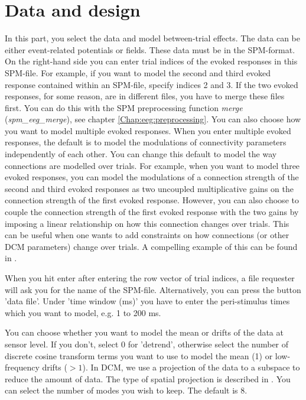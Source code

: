 \section{Data and design}
In this part, you select the data and model between-trial
effects. The data can be either event-related
potentials or fields. These data must be in the SPM-format. On the
right-hand side you can enter trial indices of the evoked responses in
this SPM-file. For example, if you want to model the
second and third evoked response contained within an SPM-file, specify
indices 2 and 3. If the two evoked responses, for some reason, are in
different files, you have to merge these files first. You can do this
with the SPM preprocessing function \textit{merge}
(\textit{spm\_eeg\_merge}), see chapter
\ref{Chap:eeg:preprocessing}. You can also choose how you want to
model multiple evoked responses. When you enter multiple evoked
responses, the default is to model the modulations of connectivity
parameters independently of each other. You can change this default to
model the way connections are modelled over trials. For
example, when you want to model three evoked responses, you can model
the modulations of a connection strength of the second and third
evoked responses as two uncoupled multiplicative gains on the connection
strength of the first evoked response. However, you can also choose to
couple the connection strength of the first evoked response with the
two gains by imposing a linear relationship on how this connection changes over trials. This can be useful when one wants to add
constraints on how connections (or other DCM parameters)
change over trials. A compelling example of this can be
found in \cite{marta_mmndcm}.

When you hit enter after entering the
row vector of trial indices, a file requester will ask you for the
name of the SPM-file. Alternatively, you can press the button
'data file'. Under 'time window (ms)' you have to enter the
peri-stimulus times which you want to model, e.g. 1 to 200 ms.

You can choose whether you want to model the mean or
drifts of the data at sensor level. If you don't,
select 0 for 'detrend', otherwise select the number of discrete cosine
transform terms you want to use to model the mean (1) or low-frequency
drifts ($> 1$). In DCM, we use a projection of the data to a subspace to reduce the amount of data. The type of spatial projection
is described in \cite{matthias_dcm_constraints}. You can select the
number of modes you wish to keep. The default is 8.

